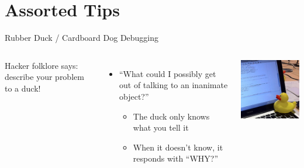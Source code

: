 \documentclass[xcolor=dvipsnames]{beamer}
\begin{document}
\section{Assorted Tips}


\begin{frame}{Rubber Duck / Cardboard Dog Debugging}
	\begin{columns}[l]
	Hacker folklore says: describe your problem to a duck!
	\begin{itemize}
		\item ``What could I possibly get out of talking to an inanimate object?''
		\pause
		\begin{itemize}
			\item The duck only knows what you tell it
			\item When it doesn't know, it responds with ``WHY?''
		\end{itemize}
	\end{itemize}
	\pause
	\linegap

	\includegraphics[width=\textwidth]{rubberduck.jpg}
	\end{columns}
\end{frame}
\end{document}
